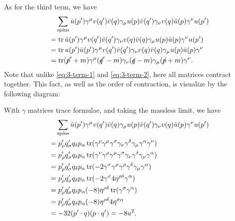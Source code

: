 \documentclass[hyperref, a4paper]{article}
\newcommand{\fsl}[1]{{\centernot{#1}}}
\begin{document}
As for the third term, we have 
\[
    \begin{aligned}
        &\quad \sum_\text{spins} \bar{u}(p') \gamma^\mu v(q') \bar{v}(q) \gamma_\mu u(p) \bar{v}(q') \gamma_\nu v(q) \bar{u}(p) \gamma^\nu u(p') \\
        &= \trace \bar{u}(p') \gamma^\mu v(q') \bar{v}(q') \gamma_\nu v(q) \bar{v}(q) \gamma_\mu u(p) \bar{u}(p) \gamma^\nu u(p') \\
        &= \trace u(p') \bar{u}(p') \gamma^\mu v(q') \bar{v}(q') \gamma_\nu v(q) \bar{v}(q) \gamma_\mu u(p) \bar{u}(p) \gamma^\nu \\
        &= \trace (\fsl{p}' + m) \gamma^\mu (\fsl{q}' - m) \gamma_\nu (\fsl{q} - m) \gamma_\mu (\fsl{p} + m) \gamma^\nu .
    \end{aligned}
\]
Note that unlike \eqref{eq:3-term-1} and \eqref{eq:3-term-2}, here all matrices contract together. This fact, as well as the order of contraction, is 
visualize by the following diagram:

With $\gamma$ matrices trace formulae, and taking the massless limit, we have 
\begin{equation}
    \begin{aligned}
        &\quad \sum_\text{spins} \bar{u}(p') \gamma^\mu v(q') \bar{v}(q) \gamma_\mu u(p) \bar{v}(q') \gamma_\nu v(q) \bar{u}(p) \gamma^\nu u(p') \\
        &= p_\rho' q'_\sigma q_\delta p_\alpha \trace(\gamma^\rho \gamma^\mu \gamma^\sigma \gamma_\nu \gamma^\delta \gamma_\mu \gamma^\alpha \gamma^\nu ) \\
        &= p_\rho' q'_\sigma q_\delta p_\alpha \trace(\gamma^\nu \gamma^\rho \gamma^\mu \gamma^\sigma \gamma_\nu \gamma^\delta \gamma_\mu \gamma^\alpha ) \\
        &= p_\rho' q'_\sigma q_\delta p_\alpha \trace(- 2 \gamma^\sigma \gamma^\mu \gamma^\rho \gamma^\delta \gamma_\mu \gamma^\alpha ) \\
        &= p_\rho' q'_\sigma q_\delta p_\alpha \trace(- 2 \gamma^\sigma 4 \eta^{\rho \delta} \gamma^\alpha ) \\
        &= p_\rho' q'_\sigma q_\delta p_\alpha (-8) \eta^{\rho \delta} \trace(\gamma^\sigma  \gamma^\alpha ) \\
        &= p_\rho' q'_\sigma q_\delta p_\alpha (-8) \eta^{\rho \delta} 4 \eta^{\sigma \alpha} \\
        &= - 32 (p' \cdot q) (p \cdot q') = -8 u^2,
    \end{aligned}
    \label{eq:3-term-3}
\end{equation}
\end{document}
